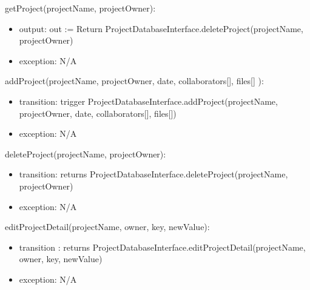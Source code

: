 \documentclass[12pt, titlepage]{article}
\begin{document}
	\noindent getProject(projectName, projectOwner):
	\begin{itemize}
		\item output: out := Return ProjectDatabaseInterface.deleteProject(projectName, projectOwner)
		
		\item exception: N/A
	\end{itemize}
	
	\noindent addProject(projectName, projectOwner, date, collaborators[], files[] ):
	\begin{itemize}
		\item transition: trigger ProjectDatabaseInterface.addProject(projectName, projectOwner, date, collaborators[], files[])
		
		\item exception: N/A
	\end{itemize}
	
	\noindent deleteProject(projectName, projectOwner):
	\begin{itemize}
		\item transition: returns ProjectDatabaseInterface.deleteProject(projectName, projectOwner)
		
		\item exception: N/A
	\end{itemize}
	
	\noindent editProjectDetail(projectName, owner, key, newValue):
	\begin{itemize}
		\item transition : returns ProjectDatabaseInterface.editProjectDetail(projectName, owner, key, newValue)
		
		\item exception: N/A
	\end{itemize}
	
\end{document}
